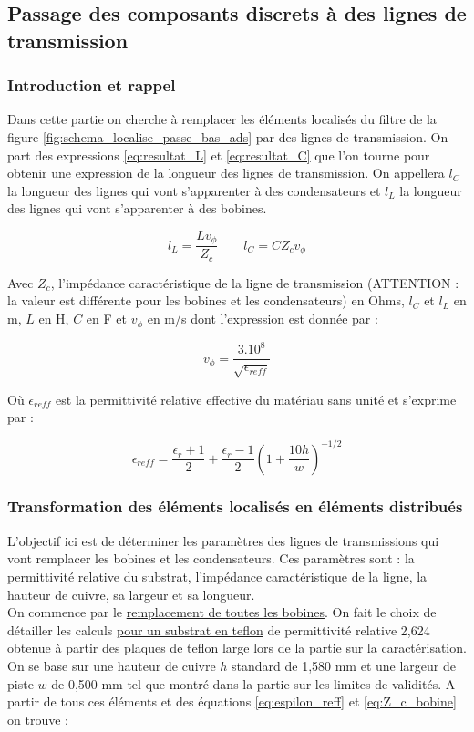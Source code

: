 \documentclass[french]{article}
\begin{document}
\subsection{Passage des composants discrets à des lignes de transmission}

\subsubsection{Introduction et rappel}

Dans cette partie on cherche à remplacer les éléments localisés du filtre de la figure \ref{fig:schema_localise_passe_bas_ads} par des lignes de transmission. On part des expressions \ref{eq:resultat_L} et \ref{eq:resultat_C} que l'on tourne pour obtenir une expression de la longueur des lignes de transmission. On appellera $l_C$ la longueur des lignes qui vont s'apparenter à des condensateurs et $l_L$ la longueur des lignes qui vont s'apparenter à des bobines.

\begin{equation}
	l_L = \frac{L v_\phi}{Z_c}
	\qquad
	l_C = C Z_c v_\phi
	\label{eq:expression_l}
\end{equation}

Avec $Z_c$, l'impédance caractéristique de la ligne de transmission (ATTENTION : la valeur est différente pour les bobines et les condensateurs) en Ohms, $l_C$ et $l_L$ en m, $L$ en H, $C$ en F et $v_\phi$ en m/s dont l'expression est donnée par :

\begin{equation}
	v_\phi = \frac{3.10^8}{\sqrt{\epsilon_{reff}}}
\end{equation}

Où $\epsilon_{reff}$ est la permittivité relative effective du matériau sans unité et s'exprime par : 

\begin{equation}
	\epsilon_{reff} = \frac{\epsilon_r + 1}{2} + \frac{\epsilon_r - 1}{2}\left(1 + \frac{10h}{w}\right)^{-1/2}
	\label{eq:espilon_reff}
\end{equation}


\subsubsection{Transformation des éléments localisés en éléments distribués}

L'objectif ici est de déterminer les paramètres des lignes de transmissions qui vont remplacer les bobines et les condensateurs. Ces paramètres sont : la permittivité relative du substrat, l'impédance caractéristique de la ligne, la hauteur de cuivre, sa largeur et sa longueur.\\
On commence par le \underline{remplacement de toutes les bobines}. On fait le choix de détailler les calculs \underline{pour un substrat en teflon} de permittivité relative 2,624 obtenue à partir des plaques de teflon large lors de la partie sur la caractérisation. On se base sur une hauteur de cuivre $h$ standard de 1,580 mm et une largeur de piste $w$ de 0,500 mm tel que montré dans la partie sur les limites de validités. A partir de tous ces éléments et des équations \ref{eq:espilon_reff} et \ref{eq:Z_c_bobine} on trouve :
\end{document}
